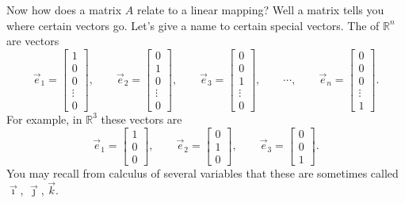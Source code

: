 Now how does a matrix $A$ relate to a linear mapping?
Well a matrix tells you where
certain vectors go.  Let's give a name to certain special vectors.
The \emph{} of ${\mathbb R}^n$ are vectors
\begin{equation*}
\vec{e}_1 =
\begin{bmatrix}
1 \\ 0 \\ 0 \\ \vdots \\ 0
\end{bmatrix} ,
\qquad
\vec{e}_2 =
\begin{bmatrix}
0 \\ 1 \\ 0 \\ \vdots \\ 0
\end{bmatrix} ,
\qquad
\vec{e}_3 =
\begin{bmatrix}
0 \\ 0 \\ 1 \\ \vdots \\ 0
\end{bmatrix} ,
\qquad
\cdots ,
\qquad
\vec{e}_n =
\begin{bmatrix}
0 \\ 0 \\ 0 \\ \vdots \\ 1
\end{bmatrix} .
\end{equation*}
For example, in ${\mathbb R}^3$ these vectors are
\begin{equation*}
\vec{e}_1 =
\begin{bmatrix}
1 \\ 0 \\ 0
\end{bmatrix} ,
\qquad
\vec{e}_2 =
\begin{bmatrix}
0 \\ 1 \\ 0
\end{bmatrix} ,
\qquad
\vec{e}_3 =
\begin{bmatrix}
0 \\ 0 \\ 1
\end{bmatrix} .
\end{equation*}
You may recall from calculus of several variables that these are
sometimes called $\vec{\imath}$, $\vec{\jmath}$, $\vec{k}$.


